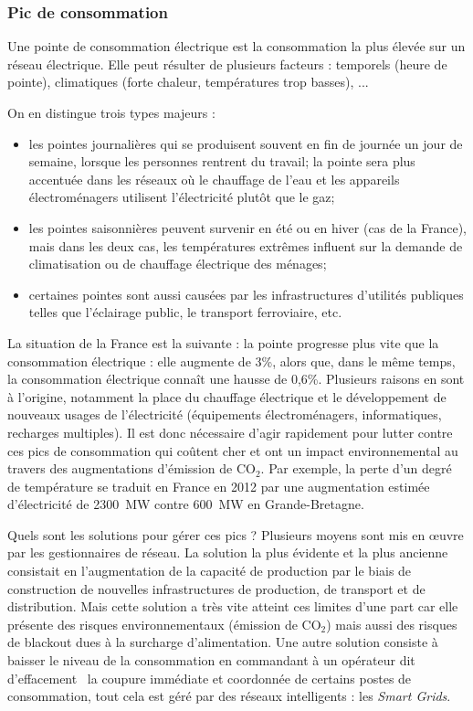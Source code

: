 \documentclass[10pt]{article}
\begin{document}
		
		\subsubsection{Pic de consommation}
			Une pointe de consommation électrique est la consommation la plus élevée sur un réseau électrique. Elle peut résulter de plusieurs facteurs : temporels (heure de pointe), climatiques (forte chaleur, températures trop basses), ...
			
			On en distingue trois types majeurs :
			
			\begin{itemize}
				\item les pointes journalières qui se produisent souvent en fin de journée un jour de semaine, lorsque les personnes rentrent du travail; la pointe sera plus accentuée dans les réseaux où le chauffage de l'eau et les appareils électroménagers utilisent l'électricité plutôt que le gaz;
				\item les pointes saisonnières peuvent survenir en été ou en hiver (cas de la France), mais dans les deux cas, les températures extrêmes influent sur la demande de climatisation ou de chauffage électrique des ménages;
				\item certaines pointes sont aussi causées par les infrastructures d'utilités publiques telles que l'éclairage public, le transport ferroviaire, etc.
			\end{itemize}
			
			La situation de la France est la suivante : la pointe progresse  plus vite que la consommation électrique : elle augmente de 3\%, alors que, dans le même temps, la consommation électrique connaît une hausse de 0,6\%. Plusieurs raisons en sont à l'origine, notamment la place du chauffage électrique et le développement de nouveaux usages de l'électricité (équipements électroménagers, informatiques, recharges multiples). Il est donc nécessaire d'agir rapidement pour lutter contre ces pics de consommation qui coûtent cher et ont un impact environnemental au travers des augmentations d'émission de CO$_2$.
			Par exemple, la perte d'un degré de température se traduit en France en 2012 par une augmentation estimée d'électricité de 2300~MW contre 600~MW en Grande-Bretagne.
			
			Quels sont les solutions pour gérer ces pics ? Plusieurs moyens sont mis en œuvre par les gestionnaires de réseau.
			La solution la plus évidente et la plus ancienne consistait en l'augmentation de la capacité de production par le biais de construction de nouvelles infrastructures de production, de transport et de distribution. Mais cette solution a très vite atteint ces limites d'une part car elle présente des risques environnementaux (émission de CO$_2$) mais aussi des risques de blackout dues à la surcharge d'alimentation.
			Une autre solution consiste à baisser le niveau de la consommation en commandant à un opérateur dit \og d'effacement \fg~la coupure immédiate et coordonnée de certains postes de consommation, tout cela est géré par des réseaux intelligents : les \textit{Smart Grids}.
		
\end{document}

